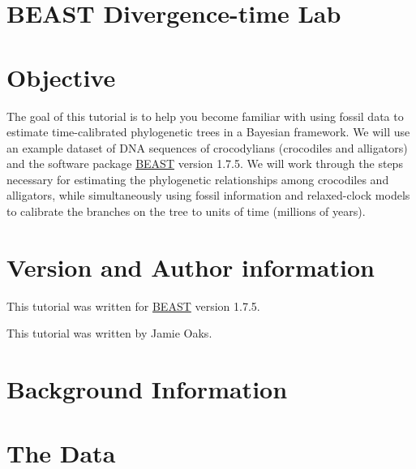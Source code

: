 \documentclass{article}
\newcommand{\localfile}[1]{\textsf{#1}\xspace}
\newcommand{\menutab}[1]{\textbf{\textit{#1}}\xspace}
\newcommand{\subsubItem}[3]{\menutab{#1}$\rightarrow$\menutab{#2}$\rightarrow$\menutab{#3}\xspace}
\newcommand{\program}[1]{#1\xspace}
\newcommand{\beast}{\href{http://beast.bio.ed.ac.uk/Main_Page}{\program{BEAST}}\xspace}
\begin{document}
{\singlespacing \tableofcontents}
\newpage
\section{BEAST Divergence-time Lab}

\section{Objective}
The goal of this tutorial is to help you become familiar with using fossil data
to estimate time-calibrated phylogenetic trees in a Bayesian framework.
We will use an example dataset of DNA sequences of crocodylians (crocodiles and alligators)
and the software package \beast version 1.7.5.
We will work through the steps necessary for estimating the phylogenetic
relationships among crocodiles and alligators, while simultaneously using
fossil information and relaxed-clock models to calibrate the branches on the
tree to units of time (millions of years).

\section{Version and Author information}
This tutorial was written for \beast version 1.7.5.

This tutorial was written by Jamie Oaks.

\section{Background Information}

\section{The Data}
\end{document}
